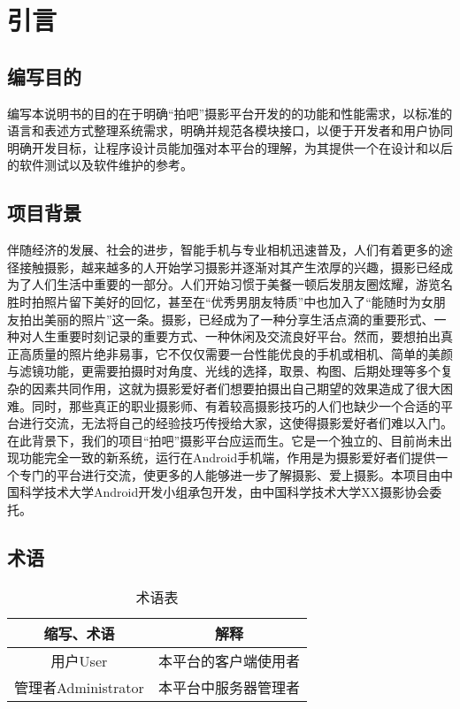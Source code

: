 \chapter{引言}
\section{编写目的}
编写本说明书的目的在于明确“拍吧”摄影平台开发的的功能和性能需求，以标准的语言和表述方式整理系统需求，明确并规范各模块接口，以便于开发者和用户协同明确开发目标，让程序设计员能加强对本平台的理解，为其提供一个在设计和以后的软件测试以及软件维护的参考。

\section{项目背景}
伴随经济的发展、社会的进步，智能手机与专业相机迅速普及，人们有着更多的途径接触摄影，越来越多的人开始学习摄影并逐渐对其产生浓厚的兴趣，摄影已经成为了人们生活中重要的一部分。人们开始习惯于美餐一顿后发朋友圈炫耀，游览名胜时拍照片留下美好的回忆，甚至在“优秀男朋友特质”中也加入了“能随时为女朋友拍出美丽的照片”这一条。摄影，已经成为了一种分享生活点滴的重要形式、一种对人生重要时刻记录的重要方式、一种休闲及交流良好平台。然而，要想拍出真正高质量的照片绝非易事，它不仅仅需要一台性能优良的手机或相机、简单的美颜与滤镜功能，更需要拍摄时对角度、光线的选择，取景、构图、后期处理等多个复杂的因素共同作用，这就为摄影爱好者们想要拍摄出自己期望的效果造成了很大困难。同时，那些真正的职业摄影师、有着较高摄影技巧的人们也缺少一个合适的平台进行交流，无法将自己的经验技巧传授给大家，这使得摄影爱好者们难以入门。在此背景下，我们的项目“拍吧”摄影平台应运而生。它是一个独立的、目前尚未出现功能完全一致的新系统，运行在Android手机端，作用是为摄影爱好者们提供一个专门的平台进行交流，使更多的人能够进一步了解摄影、爱上摄影。本项目由中国科学技术大学Android开发小组承包开发，由中国科学技术大学XX摄影协会委托。

\section{术语}
\begin{table}[htbp]
\centering
\caption{术语表} \label{tab:terminology}
\begin{tabular}{|c|c|}
    \hline
    缩写、术语 & 解释 \\
    \hline
    用户User & 本平台的客户端使用者 \\
    \hline
	管理者Administrator & 本平台中服务器管理者 \\
    \hline
\end{tabular}
\end{table}